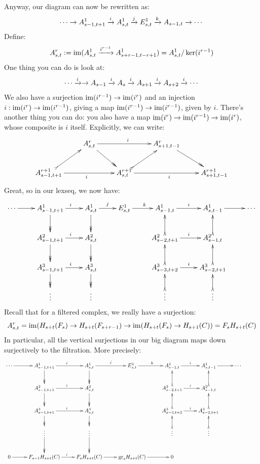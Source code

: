 Anyway, our diagram can now be rewritten as:
$$
\cdots\to A^1_{s-1,t+1} \xrightarrow{{i}} A^1_{s,t} \xrightarrow{{j}} E^1_{s,t} \xrightarrow{{k}} A_{s-1, t} \to \cdots
$$
Define:
$$
A^r_{s,t} := \operatorname{im}(A^1_{s,t} \xrightarrow{{i^{r-1}}} A^1_{s+r - 1, t-r + 1}) = A^1_{s,t}/\ker(i^{r-1})
$$
One thing you can do is look at:
$$
\cdots \xrightarrow{{i}} \to A_{s-1} \xrightarrow{{i}} A_s \xrightarrow{{i}} A_{s+1} \xrightarrow{{i}} A_{s+2} \xrightarrow{{i}} \cdots
$$
We also have a surjection $\operatorname{im}(i^{r-1}) \to \operatorname{im}(i^r)$ and an injection $i:\operatorname{im}(i^r) \to \operatorname{im}(i^{r-1})$, giving a map $\operatorname{im}(i^{r-1}) \to \operatorname{im}(i^{r-1})$, given by $i$.
There's another thing you can do: you also have a map $\operatorname{im}(i^r) \to \operatorname{im}(i^{r-1}) \to \operatorname{im}(i^r)$, whose composite is $i$ itself.
Explicitly, we can write:
\begin{equation*}
    \xymatrix{
	& A^r_{s,t} \ar@{->>}[dr]\ar[rr]^i & & A^r_{s+1,t-1}\ar@{->>}[dr] & \\
	A^{r+1}_{s-1,t+1}\ar@{>->}[ur]\ar[rr]_i & & A^{r+1}_{s,t}\ar@{>->}[ur]\ar[rr]_i & & A^{r+1}_{s+1,t-1}
    }
\end{equation*}
Great, so in our lexseq, we now have:
\begin{equation*}
    \xymatrix{
	\cdots\ar[r] & A^1_{s-1,t+1}\ar@{->>}[d] \ar[r]^i & A^1_{s,t} \ar@{->>}[d] \ar[r]^j & E^1_{s,t} \ar[r]^k & A^1_{s-1,t}\ar[r]^i & A^1_{s,t-1} \ar[r] & \cdots\\
	& A^2_{s-1,t+1}\ar@{->>}[d]\ar[r]^i & A^2_{s,t}\ar@{->>}[d] & & A^2_{s-2,t+1}\ar[r]^i \ar@{>->}[u] & A^2_{s-1,t}\ar@{>->}[u] & \\
	& A^3_{s-1,t+1}\ar[r]^i\ar@{->>}[d] & A^3_{s,t}\ar@{->>}[d] & & A^3_{s-3,t+2}\ar@{>->}[u]\ar[r]^i & A^3_{s-2,t+1}\ar@{>->}[u] &\\
	& \vdots & \vdots & & \vdots \ar@{>->}[u] & \vdots\ar@{>->}[u] &
    }
\end{equation*}
Recall that for a filtered complex, we really have a surjection:
$$
A^r_{s,t} = \operatorname{im}(H_{s+t}(F_s) \to H_{s+t}(F_{s+r-1}) \to \operatorname{im}(H_{s+t}(F_s) \to H_{s+1}(C)) = F_s H_{s+t}(C)
$$
In particular, all the vertical surjections in our big diagram maps down surjectively to the filtration.
More precisely:
\begin{equation*}
    \xymatrix{
	\cdots\ar[r] & A^1_{s-1,t+1}\ar@{->>}[d] \ar[r]^i & A^1_{s,t} \ar@{->>}[d] \ar[r]^j & E^1_{s,t} \ar[r]^k & A^1_{s-1,t}\ar[r]^i & A^1_{s,t-1} \ar[r] & \cdots\\
	& A^2_{s-1,t+1}\ar@{->>}[d]\ar[r]^i & A^2_{s,t}\ar@{->>}[d] & & A^2_{s-2,t+1}\ar[r]^i \ar@{>->}[u] & A^2_{s-1,t}\ar@{>->}[u] & \\
	& A^3_{s-1,t+1}\ar[r]^i\ar@{->>}[d] & A^3_{s,t}\ar@{->>}[d] & & A^3_{s-3,t+2}\ar@{>->}[u]\ar[r]^i & A^3_{s-2,t+1}\ar@{>->}[u] &\\
	& \vdots\ar@{->>}[d] & \vdots\ar@{->>}[d] & & \vdots \ar@{>->}[u] & \vdots\ar@{>->}[u] &\\
	0\ar[r] & F_{s-1} H_{s+t}(C) \ar[r]^i & F_s H_{s+t}(C) \ar[r] & \gr_s H_{s+t}(C)\ar[r] & 0 & & &
    }
\end{equation*}
